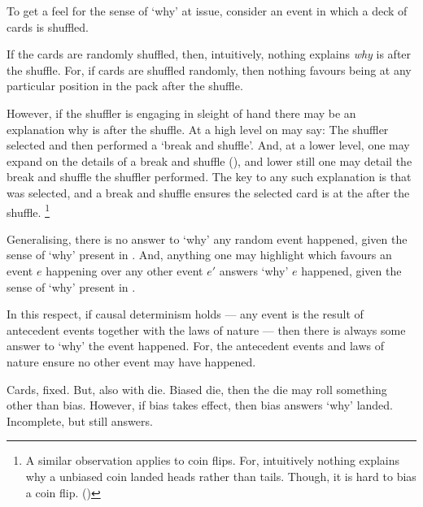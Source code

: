 \begin{note}
  To get a feel for the sense of `why' at issue, consider an event in which a deck of cards is shuffled.

  If the cards are randomly shuffled, then, intuitively, nothing explains \emph{why} \mainCard{} is \mainCardPos{} after the shuffle.
  For, if cards are shuffled randomly, then nothing favours \mainCard{} being at any particular position in the pack after the shuffle.

  However, if the shuffler is engaging in sleight of hand there may be an explanation why \mainCard{} is \mainCardPos{} after the shuffle.
  At a high level on may say: The shuffler selected \mainCard{} and then performed a `break and shuffle'.
  And, at a lower level, one may expand on the details of a break and shuffle (\cite[cf.][189--190]{Hilliard:1994aa}), and lower still one may detail the break and shuffle the shuffler performed.
  The key to any such explanation is that \mainCard{} was selected, and a break and shuffle ensures the selected card is at the \mainCardPos{} after the shuffle.%
  \footnote{
    A similar observation applies to coin flips.
    For, intuitively nothing explains why a unbiased coin landed heads rather than tails.
    Though, it is hard to bias a coin flip. (\cite{Gelman:2002ww})
  }
\end{note}


\begin{note}
  Generalising, there is no answer to `why' any random event happened, given the sense of `why' present in \qWhy{}.
  And, anything one may highlight which favours an event \(e\) happening over any other event \(e'\) answers `why' \(e\) happened, given the sense of `why' present in \qWhy{}.

  In this respect, if causal determinism holds --- any event is the result of antecedent events together with the laws of nature --- then there is always some answer to `why' the event happened.
  For, the antecedent events and laws of nature ensure no other event may have happened.
\end{note}


\begin{note}
  Cards, fixed.
  But, also with die.
  Biased die, then the die may roll something other than bias.
  However, if bias takes effect, then bias answers `why' landed.
  Incomplete, but still answers.
\end{note}


